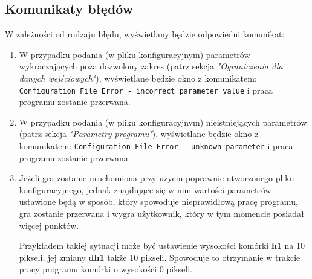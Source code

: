 \documentclass[a4paper]{article}
\begin{document}
\subsection{Komunikaty b\l{}\k{e}d\'ow}
W zale\.zno\'sci od rodzaju b\l{}\k{e}du, wy\'swietlany b\k{e}dzie odpowiedni komunikat:
\begin{enumerate}
	\item W przypadku podania (w pliku konfiguracyjnym) parametr\'ow wykraczaj\k{a}cych poza dozwolony zakres (patrz sekcja \textit{"Ograniczenia dla danych wejściowych"}), wy\'swietlane b\k{e}dzie okno z komunikatem: \texttt{Configuration File Error - incorrect parameter value} i praca programu zostanie przerwana.
	\item W przypadku podania (w pliku konfiguracyjnym) nieistniej\k{a}cych parametr\'ow (patrz sekcja \textit{"Parametry programu"}), wy\'swietlane b\k{e}dzie okno z komunikatem: \texttt{Configuration File Error - unknown parameter} i praca programu zostanie przerwana.
	\item Je\.zeli gra zostanie uruchomiona przy u\.zyciu poprawnie utworzonego pliku konfiguracyjnego, jednak znajduj\k{a}ce si\k{e} w nim warto\'sci parametr\'ow ustawione b\k{e}d\k{a} w spos\'ob, kt\'ory spowoduje nieprawid\l{}ow\k{a} prac\k{e} programu, gra zostanie przerwana i wygra u\.zytkownik, kt\'ory w tym momencie posiada\l{} wi\k{e}cej punkt\'ow.
	
	Przyk\l{}adem takiej sytuacji mo\.ze by\'c ustawienie wysoko\'sci kom\'orki \textbf{h1} na 10 pikseli, jej zmiany \textbf{dh1} tak\.ze 10 pikseli. Spowoduje to otrzymanie w trakcie pracy programu kom\'orki o wysoko\'sci 0 pikseli.
\end{enumerate}
\end{document}

